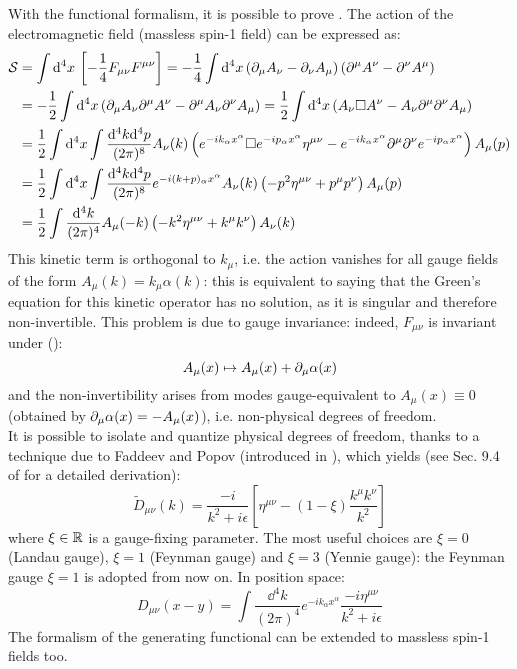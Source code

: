 With the functional formalism, it is possible to prove . The action of the electromagnetic field (massless spin-1 field) can be expressed as:
\begin{equation*}
  \begin{split}
    \mathcal{S}
    & = \int \mathrm{d}^4x\, \left[ -\frac{1}{4} F_{\mu \nu} F^{\mu \nu} \right] = - \frac{1}{4} \int \mathrm{d}^4x \left( \partial_\mu A_\nu - \partial_\nu A_\mu \right) \left( \partial^\mu A^\nu - \partial^\nu A^\mu \right) \\
    & = - \frac{1}{2} \int \mathrm{d}^4x \left( \partial_\mu A_\nu \partial^\mu A^\nu - \partial^\mu A_\nu \partial^\nu A_\mu \right) = \frac{1}{2} \int \mathrm{d}^4x \left( A_\nu \Box A^\nu - A_\nu \partial^\mu \partial^\nu A_\mu \right) \\
    & = \frac{1}{2} \int \mathrm{d}^4x \int \frac{\mathrm{d}^4k \mathrm{d}^4p}{(2\pi)^8} A_\nu(k) \left( e^{-i k_\alpha x^\alpha} \Box e^{-i p_\alpha x^\alpha} \eta^{\mu \nu} - e^{-i k_\alpha x^\alpha} \partial^\mu \partial^\nu e^{-i p_\alpha x^\alpha} \right) A_\mu(p) \\
    & = \frac{1}{2} \int \mathrm{d}^4x \int \frac{\mathrm{d}^4k \mathrm{d}^4p}{(2\pi)^8} e^{-i (k+p)_\alpha x^\alpha} A_\nu(k) \left( -p^2 \eta^{\mu \nu} + p^\mu p^\nu \right) A_\mu(p) \\
    & = \frac{1}{2} \int \frac{\mathrm{d}^4k}{(2\pi)^4} A_\mu(-k) \left( -k^2 \eta^{\mu \nu} + k^\mu k^\nu \right) A_\nu(k)
  \end{split}
\end{equation*}
This kinetic term is orthogonal to $ k_\mu $, i.e. the action vanishes for all gauge fields of the form $ A_\mu(k) = k_\mu \alpha(k) $: this is equivalent to saying that the Green's equation for this kinetic operator has no solution, as it is singular and therefore non-invertible. This problem is due to gauge invariance: indeed, $ F_{\mu \nu} $ is invariant under ():
\begin{equation}
  A_\mu(x) \mapsto A_\mu(x) + \partial_\mu \alpha(x)
\end{equation}
and the non-invertibility arises from modes gauge-equivalent to $ A_\mu(x) \equiv 0 $ (obtained by $ \partial_\mu \alpha(x) = - A_\mu(x) $), i.e. non-physical degrees of freedom. \\
It is possible to isolate and quantize physical degrees of freedom, thanks to a technique due to Faddeev and Popov (introduced in \cite{faddeev-popov}), which yields (see Sec. 9.4 of \cite{peskin} for a detailed derivation):
\begin{equation}
  \tilde{D}_{\mu \nu}(k) = \frac{-i}{k^2 + i\epsilon} \left[ \eta^{\mu \nu} - \left( 1 - \xi \right) \frac{k^\mu k^\nu}{k^2} \right]
\end{equation}
where $ \xi \in \mathbb{R} $ is a gauge-fixing parameter. The most useful choices are $ \xi = 0 $ (Landau gauge), $ \xi = 1 $ (Feynman gauge) and $ \xi = 3 $ (Yennie gauge): the Feynman gauge $ \xi = 1 $ is adopted from now on. In position space:
\begin{equation}
  D_{\mu \nu}(x-y) = \int \frac{\dd^4k}{(2\pi)^4} e^{-i k_\alpha x^\alpha} \frac{-i \eta^{\mu \nu}}{k^2 + i\epsilon}
\end{equation}
The formalism of the generating functional can be extended to massless spin-1 fields too.

